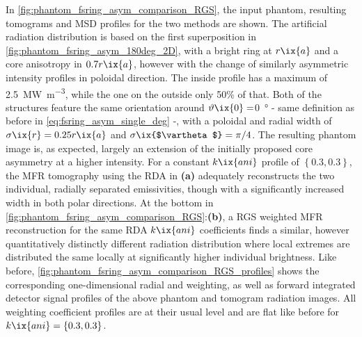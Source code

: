             In \cref{fig:phantom_fsring_asym_comparison_RGS}, the input phantom, resulting tomograms and MSD profiles for the two methods are shown. The artificial radiation distribution is based on the first superposition in \cref{fig:phantom_fsring_asym_180deg_2D}, with a bright ring at $r\ix{a}$ and a core anisotropy in $0.7r\ix{a}$, however with the change of similarly asymmetric intensity profiles in poloidal direction. The inside profile has a maximum of \SI{2.5}{\mega\watt\per\cubic\meter}, while the one on the outside only 50\% of that. Both of the structures feature the same orientation around $\vartheta\ix{0}=$\SI{0}{\degree} - same definition as before in \cref{eq:fsring_asym_single_deg} -, with a poloidal and radial width of $\sigma\ix{r}=0.25r\ix{a}$ and $\sigma\ix{$\vartheta$}=\pi/4$. The resulting phantom image is, as expected, largely an extension of the initially proposed core asymmetry at a higher intensity. For a constant $k\ix{ani}$ profile of $\left\{0.3, 0.3\right\}$, the MFR tomography using the RDA in \textbf{(a)} adequately reconstructs the two individual, radially separated emissivities, though with a significantly increased width in both polar directions. At the bottom in \cref{fig:phantom_fsring_asym_comparison_RGS}:\textbf{(b)}, a RGS weighted MFR reconstruction for the same RDA $k\ix{ani}$ coefficients finds a similar, however quantitatively distinctly different radiation distribution where local extremes are distributed the same locally at significantly higher individual brightness. Like before, \cref{fig:phantom_fsring_asym_comparison_RGS_profiles} shows the corresponding one-dimensional radial and weighting, as well as forward integrated detector signal profiles of the above phantom and tomogram radiation images. All weighting coefficient profiles are at their usual level and are flat like before for $k\ix{ani}=\left\{0.3, 0.3\right\}$.%
%
